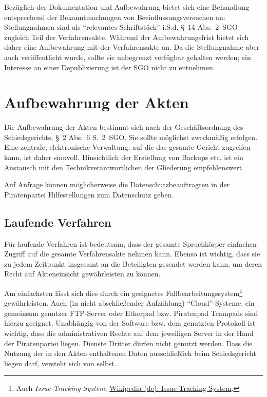 Bezüglich der Dokumentation und Aufbewahrung bietet sich eine Behandlung entsprechend der Bekanntmachungen von Beeinflussungsversuchen an:
Stellungnahmen sind als \enquote{relevantes Schriftstück} i.S.d. \S~14 Abs.~2~SGO zugleich Teil der Verfahrensakte.
Während der Aufbewahrungsfrist bietet sich daher eine Aufbewahrung mit der Verfahrensakte an.
Da die Stellungnahme aber auch veröffentlicht wurde, sollte sie unbegrenzt verfügbar gehalten werden; ein Interesse an einer Depublizierung ist der SGO nicht zu entnehmen.

\section{Aufbewahrung der Akten}
\label{Dokumentation:Aufbewahrung}
Die Aufbewahrung der Akten bestimmt sich nach der Geschäftsordnung des Schiedsgerichts, \S~2 Abs.~6 S.~2~SGO.
Sie sollte möglichst zweckmäßig erfolgen.
Eine zentrale, elektronische Verwaltung, auf die das gesamte Gericht zugreifen kann, ist daher sinnvoll.
Hinsichtlich der Erstellung von Backups etc. ist ein Austausch mit den Technikverantwortlichen der Gliederung empfehlenswert.

Auf Anfrage können möglicherweise die Datenschutzbeauftragten in der Piratenpartei Hilfestellungen zum Datenschutz geben.

\subsection{Laufende Verfahren}
Für laufende Verfahren ist bedeutsam, dass der gesamte Spruchkörper einfachen Zugriff auf die gesamte Verfahrensakte nehmen kann.
Ebenso ist wichtig, dass sie zu jedem Zeitpunkt insgesamt an die Beteiligten gesendet werden kann, um deren Recht auf Akteneinsicht gewährleisten zu können.

Am einfachsten lässt sich dies durch ein geeignetes Fallbearbeitungssystem\footnote{Auch \emph{Issue-Tracking-System}, \href{https://de.wikipedia.org/wiki/Issue-Tracking-System}{Wikipedia (de): Issue-Tracking-System}.} gewährleisten.
Auch (in nicht abschließender Aufzählung) \enquote{Cloud}-Systeme, ein gemeinsam genutzer FTP-Server oder Etherpad bzw. Piratenpad Teampads sind hierzu geeignet.
Unabhängig von der Software bzw. dem genutzten Protokoll ist wichtig, dass die administrativen Rechte auf dem jeweiligen Server in der Hand der Piratenpartei liegen.
Dienste Dritter dürfen nicht genutzt werden.
Dass die Nutzung der in den Akten enthaltenen Daten ausschließlich beim Schiedsgericht liegen darf, versteht sich von selbst.

